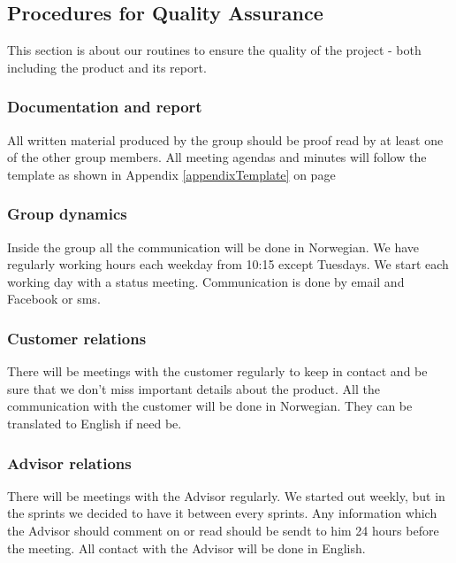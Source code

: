 \subsection{Procedures for Quality Assurance}
This section is about our routines to ensure the quality of the project - both including the product and its report. 

\subsubsection{Documentation and report}
All written material produced by the group should be proof read by at least one of the other group members. All meeting agendas and minutes will follow the template as shown in Appendix \ref{appendixTemplate} on page \pageref{appendixTemplate}


\subsubsection{Group dynamics}
Inside the group all the communication will be done in Norwegian. We have regularly working hours each weekday from 10:15 except Tuesdays. We start each working day with a status meeting. 
Communication is done by email and Facebook or sms. 

\subsubsection{Customer relations}
There will be meetings with the customer regularly to keep in contact and be sure that we don't miss important details about the product. All the communication with the customer will be done in Norwegian. They can be translated to English if need be.


\subsubsection{Advisor relations}
There will be meetings with the Advisor regularly. We started out weekly, but in the sprints we decided to have it between every sprints. Any information which the Advisor should comment on or read should be sendt to him 24 hours before the meeting. All contact with the Advisor will be done in English. 